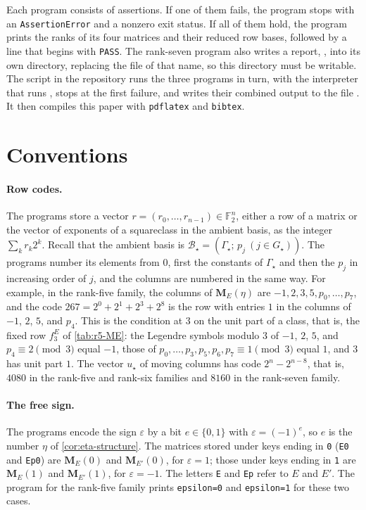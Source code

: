 \documentclass[12pt,oneside,openany]{book}
\theoremstyle{definition}
\theoremstyle{plain}
\numberwithin{equation}{chapter}
\theoremstyle{plain}
\theoremstyle{definition}
\theoremstyle{remark}
\newcommand{\F}{\mathbb F}
\newcommand{\cB}{\mathcal B}
\newcommand{\eps}{\varepsilon}
\begin{document}
Each program consists of assertions. If one of them fails, the program stops with an \texttt{AssertionError} and a nonzero exit status. If all of them hold, the program prints the ranks of its four matrices and their reduced row bases, followed by a line that begins with \texttt{PASS}. The rank-seven program also writes a report, , into its own directory, replacing the file of that name, so this directory must be writable. The script  in the repository runs the three programs in turn, with the interpreter that runs , stops at the first failure, and writes their combined output to the file . It then compiles this paper with \texttt{pdflatex} and \texttt{bibtex}.

\section{Conventions}\label{sec:verification-conventions}

\paragraph{Row codes.} The programs store a vector $r=(r_0,\dots,r_{n-1})\in\F_2^n$, either a row of a matrix or the vector of exponents of a squareclass in the ambient basis, as the integer $\sum_kr_k2^k$. Recall that the ambient basis is $\cB_\star=(\Gamma_\star;\,p_j\ (j\in G_\star))$. The programs number its elements from $0$, first the constants of $\Gamma_\star$ and then the $p_j$ in increasing order of $j$, and the columns are numbered in the same way. For example, in the rank-five family, the columns of $\mathbf M_E(\eta)$ are $-1,2,3,5,p_0,\dots,p_7$, and the code $267=2^0+2^1+2^3+2^8$ is the row with entries $1$ in the columns of $-1$, $2$, $5$, and $p_4$. This is the condition at $3$ on the unit part of a class, that is, the fixed row $f^E_3$ of \cref{tab:r5-ME}: the Legendre symbols modulo $3$ of $-1$, $2$, $5$, and $p_4\equiv2\pmod 3$ equal $-1$, those of $p_0,\dots,p_3,p_5,p_6,p_7\equiv1\pmod3$ equal $1$, and $3$ has unit part $1$. The vector $u_\star$ of moving columns has code $2^n-2^{n-8}$, that is, $4080$ in the rank-five and rank-six families and $8160$ in the rank-seven family.

\paragraph{The free sign.} The programs encode the sign $\eps$ by a bit $e\in\{0,1\}$ with $\eps=(-1)^e$, so $e$ is the number $\eta$ of \cref{cor:eta-structure}. The matrices stored under keys ending in \texttt{0} (\texttt{E0} and \texttt{Ep0}) are $\mathbf M_E(0)$ and $\mathbf M_{E'}(0)$, for $\eps=1$; those under keys ending in \texttt{1} are $\mathbf M_E(1)$ and $\mathbf M_{E'}(1)$, for $\eps=-1$. The letters \texttt{E} and \texttt{Ep} refer to $E$ and $E'$. The program for the rank-five family prints \texttt{epsilon=0} and \texttt{epsilon=1} for these two cases.
\end{document}
